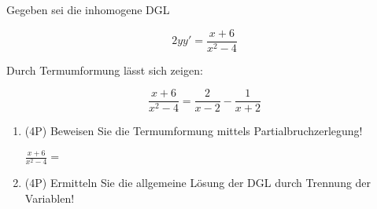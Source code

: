 Gegeben sei die inhomogene DGL

$$2yy' = \frac{x+6}{x^2-4}$$

Durch Termumformung lässt sich zeigen:

$$\frac{x+6}{x^2-4} = \frac{2}{x-2} - \frac{1}{x+2}$$

\begin{enumerate}[label=(\alph*)]

\item (4P) Beweisen Sie die Termumformung mittels Partialbruchzerlegung!

$\frac{x+6}{x^2-4} = $

\bigskip
\bigskip
\bigskip
\bigskip
\bigskip
\bigskip
\bigskip
\bigskip
\bigskip
\bigskip
\bigskip
\bigskip

\item (4P) Ermitteln Sie die allgemeine Lösung der DGL durch Trennung der Variablen!

\bigskip
\bigskip
\bigskip
\bigskip
\bigskip
\bigskip
\bigskip
\bigskip
\bigskip

\end{enumerate}
